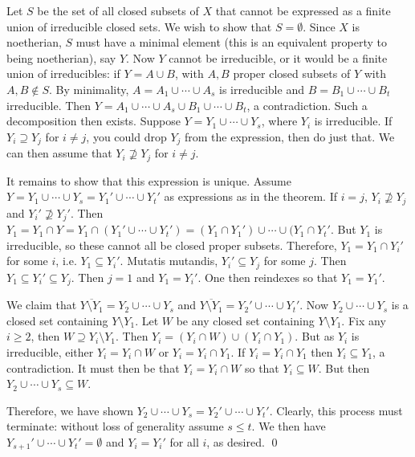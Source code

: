 \pf Let $S$ be the set of all closed subsets of $X$ that cannot be expressed as a finite union of irreducible closed sets. We wish to show that $S= \emptyset$. Since $X$ is noetherian, $S$ must have a minimal element (this is an equivalent property to being noetherian), say $Y$. Now $Y$ cannot be irreducible, or it would be a finite union of irreducibles: if $Y= A \cup B$, with $A, B$ proper closed subsets of $Y$ with $A,B \notin S$. By minimality, $A= A_1 \cup \cdots \cup A_s$ is irreducible and $B= B_1 \cup \cdots \cup B_t$ irreducible. Then $Y= A_1 \cup \cdots \cup A_s \cup B_1 \cup \cdots \cup B_t$, a contradiction. Such a decomposition then exists. Suppose $Y= Y_1 \cup \cdots \cup Y_s$, where $Y_i$ is irreducible. If $Y_i \supseteq Y_j$ for $i \neq j$, you could drop $Y_j$ from the expression, then do just that. We can then assume that $Y_i \not\supseteq Y_j$ for $i \neq j$. 

It remains to show that this expression is unique. Assume $Y= Y_1 \cup \cdots \cup Y_s= Y_1' \cup \cdots \cup Y_t'$ as expressions as in the theorem. If $i=j$, $Y_i \not\supseteq Y_j$ and $Y_i' \not\supseteq Y_j'$. Then $Y_1= Y_1 \cap Y= Y_1 \cap (Y_1' \cup \cdots \cup Y_t')= (Y_1 \cap Y_1') \cup \cdots \cup (Y_1 \cap Y_t'$. But $Y_1$ is irreducible, so these cannot all be closed proper subsets. Therefore, $Y_1= Y_1 \cap Y_i'$ for some $i$, i.e. $Y_1 \subseteq Y_i'$. Mutatis mutandis, $Y_i' \subseteq Y_j$ for some $j$. Then $Y_1 \subseteq Y_i' \subseteq Y_j$. Then $j=1$ and $Y_1= Y_i'$. One then reindexes so that $Y_1= Y_1'$. 

We claim that $\overline{Y \setminus Y_1}= Y_2 \cup \cdots \cup Y_s$ and $\overline{Y \setminus Y_1}= Y_2' \cup \cdots \cup Y_t'$. Now $Y_2 \cup \cdots \cup Y_s$ is a closed set containing $Y \setminus Y_1$. Let $W$ be any closed set containing $Y \setminus Y_1$. Fix any $i \geq 2$, then $W \supseteq Y_i \setminus Y_1$. Then $Y_i= (Y_i \cap W) \cup (Y_i \cap Y_1)$. But as $Y_i$ is irreducible, either $Y_i= Y_i \cap W$ or $Y_i= Y_i \cap Y_1$. If $Y_i= Y_i \cap Y_1$ then $Y_i \subseteq Y_1$, a contradiction. It must then be that $Y_i= Y_i \cap W$ so that $Y_i \subseteq W$. But then $Y_2 \cup \cdots \cup Y_s \subseteq W$.

Therefore, we have shown $Y_2 \cup \cdots \cup Y_s= Y_2' \cup \cdots \cup Y_t'$. Clearly, this process must terminate: without loss of generality assume $s \leq t$. We then have $Y_{s+1}' \cup \cdots \cup Y_t'= \emptyset$ and $Y_i= Y_i'$ for all $i$, as desired. \qed \\


